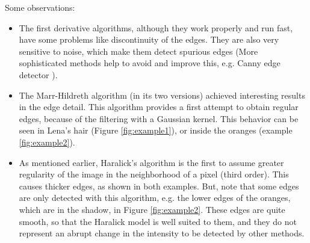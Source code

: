 \documentclass{ipol}
\numberwithin{equation}{section}
\numberwithin{table}{section}
\begin{document}
Some observations: 
\begin{itemize}
	\item The first derivative algorithms, although they work properly and run fast, have some problems like discontinuity of the edges. They are also very sensitive to noise, which make them detect spurious edges (More sophisticated methods help to avoid and improve this, e.g. Canny edge detector \cite{Canny1986}). \\
	\item The Marr-Hildreth algorithm (in its two versions) achieved interesting results in the edge detail. This algorithm provides a first attempt to obtain regular edges, because of the filtering with a Gaussian kernel. This behavior can be seen in Lena's hair (Figure \ref{fig:example1}), or inside the oranges (example \ref{fig:example2}). \\
	\item As mentioned earlier, Haralick's algorithm is the first to assume greater regularity of the image in the neighborhood of a pixel (third order). This causes thicker edges, as shown in both examples. But, note that some edges are only detected with this algorithm, e.g. the lower edges of the oranges, which are in the shadow, in Figure \ref{fig:example2}. These edges are quite smooth, so that the Haralick model is well suited to them, and they do not represent an abrupt change in the intensity to be detected by other methods. \\
\end{itemize}
\end{document}
